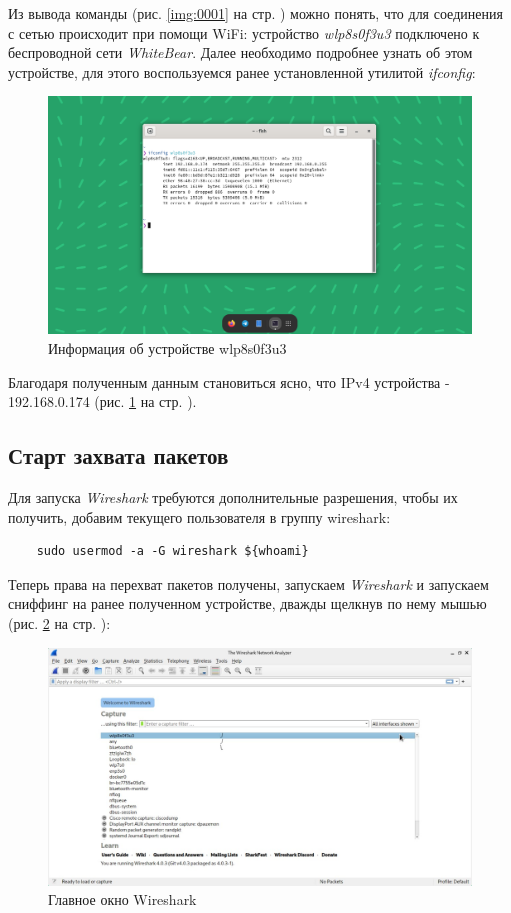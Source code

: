\documentclass[a4paper]{article}
\begin{document}
  Из вывода команды (рис. \ref{img:0001} на стр. \pageref{img:0001}) можно понять, что для соединения с сетью происходит при помощи WiFi:
  устройство \textit{wlp8s0f3u3} подключено к беспроводной сети \textit{WhiteBear}.
  Далее необходимо подробнее узнать об этом устройстве,
  для этого воспользуемся ранее установленной утилитой \textit{ifconfig}:

  \begin{figure}[H]
    \centering
    \includegraphics[width=1.0\textwidth]{01_0002}
    \caption{Информация об устройстве wlp8s0f3u3}
    \label{img:0002}
  \end{figure}

  Благодаря полученным данным становиться ясно, что IPv4 устройства - 192.168.0.174 (рис. \ref{img:0002} на стр. \pageref{img:0002}).

  \subsection{Старт захвата пакетов}

  Для запуска \textit{Wireshark} требуются дополнительные разрешения, чтобы их получить, добавим
  текущего пользователя в группу wireshark:

  \begin{verbatim}
    sudo usermod -a -G wireshark ${whoami}
  \end{verbatim}  
  Теперь права на перехват пакетов получены, запускаем \textit{Wireshark} и запускаем сниффинг
  на ранее полученном устройстве, дважды щелкнув по нему мышью (рис. \ref{img:0004} на стр. \pageref{img:0004}):
  \begin{figure}[H]
    \centering
    \includegraphics[width=1.0\textwidth]{01_0004}
    \caption{Главное окно Wireshark}
    \label{img:0004}
  \end{figure}
\end{document}
